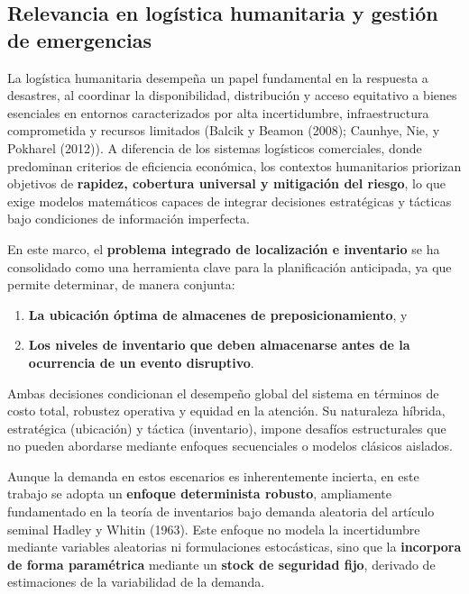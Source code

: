 \documentclass[
  spanish,
  us-letterpaper,
]{scrreprt}
\providecommand{\tightlist}{%
  \setlength{\itemsep}{0pt}\setlength{\parskip}{0pt}}
\numberwithin{equation}{section}
\begin{document}
\subsection{Relevancia en logística humanitaria y gestión de
emergencias}\label{sec-problema}

La logística humanitaria desempeña un papel fundamental en la respuesta
a desastres, al coordinar la disponibilidad, distribución y acceso
equitativo a bienes esenciales en entornos caracterizados por alta
incertidumbre, infraestructura comprometida y recursos limitados (Balcik
y Beamon (2008); Caunhye, Nie, y Pokharel (2012)). A diferencia de los
sistemas logísticos comerciales, donde predominan criterios de
eficiencia económica, los contextos humanitarios priorizan objetivos de
\textbf{rapidez, cobertura universal y mitigación del riesgo}, lo que
exige modelos matemáticos capaces de integrar decisiones estratégicas y
tácticas bajo condiciones de información imperfecta.

En este marco, el \textbf{problema integrado de localización e
inventario} se ha consolidado como una herramienta clave para la
planificación anticipada, ya que permite determinar, de manera conjunta:

\begin{enumerate}
\def\labelenumi{\arabic{enumi}.}
\tightlist
\item
  \textbf{La ubicación óptima de almacenes de preposicionamiento}, y\\
\item
  \textbf{Los niveles de inventario que deben almacenarse antes de la
  ocurrencia de un evento disruptivo}.
\end{enumerate}

Ambas decisiones condicionan el desempeño global del sistema en términos
de costo total, robustez operativa y equidad en la atención. Su
naturaleza híbrida, estratégica (ubicación) y táctica (inventario),
impone desafíos estructurales que no pueden abordarse mediante enfoques
secuenciales o modelos clásicos aislados.

Aunque la demanda en estos escenarios es inherentemente incierta, en
este trabajo se adopta un \textbf{enfoque determinista robusto},
ampliamente fundamentado en la teoría de inventarios bajo demanda
aleatoria del artículo seminal Hadley y Whitin (1963). Este enfoque no
modela la incertidumbre mediante variables aleatorias ni formulaciones
estocásticas, sino que la \textbf{incorpora de forma paramétrica}
mediante un \textbf{stock de seguridad fijo}, derivado de estimaciones
de la variabilidad de la demanda.
\end{document}
